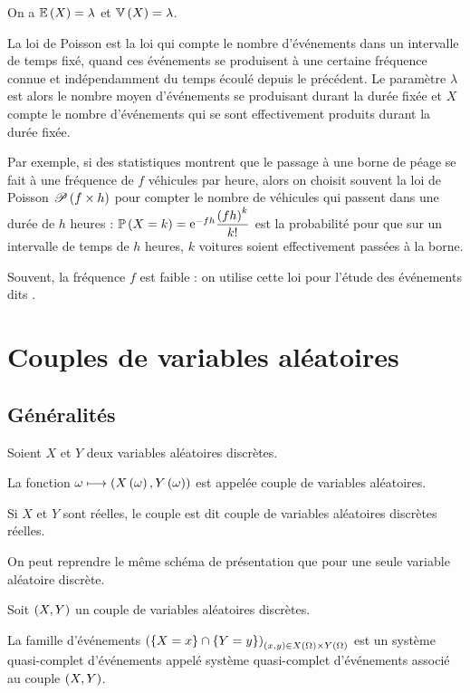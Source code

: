 On a \(\operatorname{\mathbb{E}}\left(X\right)=\lambda\) et \(\operatorname{\mathbb{V}}\left(X\right)=\lambda\).

La loi de Poisson est la loi qui compte le nombre d'événements dans un intervalle de temps fixé, quand ces événements se produisent à une certaine fréquence connue et indépendamment du temps écoulé depuis le précédent. Le paramètre \(\lambda\) est alors le nombre moyen d'événements se produisant durant la durée fixée et \(X\) compte le nombre d'événements qui se sont effectivement produits durant la durée fixée.

Par exemple, si des statistiques montrent que le passage à une borne de péage se fait à une fréquence de \(f\) véhicules par heure, alors on choisit souvent la loi de Poisson \(\mathscr{P}\left(f\times h\right)\) pour compter le nombre de véhicules qui passent dans une durée de \(h\) heures : \(\mathbb{P}\left(X=k\right)=\mathrm{e}^{-fh}\dfrac{\left(fh\right)^k}{k!}\) est la probabilité pour que sur un intervalle de temps de \(h\) heures, \(k\) voitures soient effectivement passées à la borne.

Souvent, la fréquence \(f\) est faible : on utilise cette loi pour l'étude des événements dits .

\section{Couples de variables aléatoires}

\subsection{Généralités}

\begin{defi}
Soient \(X\) et \(Y\) deux variables aléatoires discrètes.

La fonction \(\omega\longmapsto\left(X\left(\omega\right),Y\left(\omega\right)\right)\) est appelée couple de variables aléatoires.

Si \(X\) et \(Y\) sont réelles, le couple est dit couple de variables aléatoires discrètes réelles.
\end{defi}

On peut reprendre le même schéma de présentation que pour une seule variable aléatoire discrète.

\begin{prop}
Soit \(\left(X,Y\right)\) un couple de variables aléatoires discrètes.

La famille d'événements \(\left(\left\lbrace X=x\right\rbrace\cap\left\lbrace Y=y\right\rbrace\right)_{\left(x,y\right)\in X\left(\Omega\right)\times Y\left(\Omega\right)}\) est un système quasi-complet d'événements appelé système quasi-complet d'événements associé au couple \(\left(X,Y\right)\).
\end{prop}

